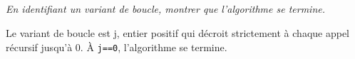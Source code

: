 \documentclass[10pt,fleqn]{article} %
\begin{document}
\subparagraph{}
\textit{En identifiant un variant de boucle, montrer que l'algorithme se termine.}
\ifprof
\begin{corrige}
Le variant de boucle est j, entier positif qui décroit strictement à chaque appel récursif jusqu'à 0. À \texttt{j==0}, l'algorithme se termine.
\end{corrige}
\else
\fi
%
\end{document}
